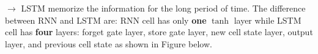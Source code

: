 \documentclass[letterpaper, 10.5pt,landscape]{article}
\begin{document}
\begin{multicols*}{3}










$\rightarrow$ LSTM memorize the information for the long period of time. The difference between RNN and LSTM are: RNN cell has only \textbf{one} $\tanh$ layer while LSTM cell has \textbf{four} layers: forget gate layer, store gate layer, new cell state layer, output layer, and previous cell state as shown in Figure below.










\end{multicols*}
\end{document}
